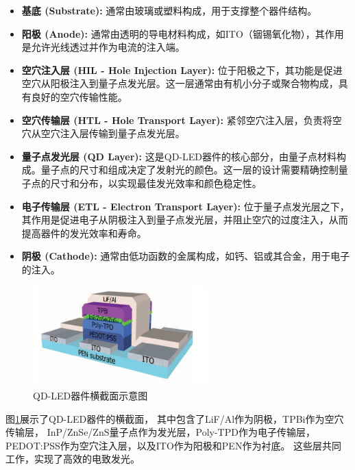 \documentclass[12pt,hyperref,a4paper,UTF8]{ctexart}
\begin{document}
\begin{itemize}
  \item \textbf{基底 (Substrate):} 通常由玻璃或塑料构成，用于支撑整个器件结构。
  \item \textbf{阳极 (Anode):} 通常由透明的导电材料构成，如ITO（铟锡氧化物），其作用是允许光线透过并作为电流的注入端。
  
  \item \textbf{空穴注入层 (HIL - Hole Injection Layer):} 位于阳极之下，其功能是促进空穴从阳极注入到量子点发光层。这一层通常由有机小分子或聚合物构成，具有良好的空穴传输性能。
  
  \item \textbf{空穴传输层 (HTL - Hole Transport Layer):} 紧邻空穴注入层，负责将空穴从空穴注入层传输到量子点发光层。
  
  \item \textbf{量子点发光层 (QD Layer):} 这是QD-LED器件的核心部分，由量子点材料构成。量子点的尺寸和组成决定了发射光的颜色。这一层的设计需要精确控制量子点的尺寸和分布，以实现最佳发光效率和颜色稳定性。
  
  \item \textbf{电子传输层 (ETL - Electron Transport Layer):} 位于量子点发光层之下，其作用是促进电子从阴极注入到量子点发光层，并阻止空穴的过度注入，从而提高器件的发光效率和寿命。
  
  \item \textbf{阴极 (Cathode):} 通常由低功函数的金属构成，如钙、铝或其合金，用于电子的注入。
\end{itemize}

\begin{figure}[h]
  \centering
  \includegraphics[width=0.6\textwidth]{figures/fig/image9.png} %
  \caption{QD-LED器件横截面示意图\cite{kim2013indium}}
  \label{fig:qd_led_cross_section}
\end{figure}

图\ref{fig:qd_led_cross_section}展示了QD-LED器件的横截面，
其中包含了LiF/Al作为阴极，TPBi作为空穴传输层，
InP/ZnSe/ZnS量子点作为发光层，Poly-TPD作为电子传输层，
PEDOT:PSS作为空穴注入层，以及ITO作为阳极和PEN作为衬底。
这些层共同工作，实现了高效的电致发光。\cite{kim2013indium}
\end{document}
